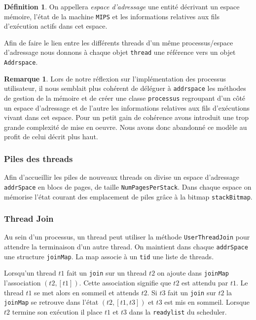 \documentclass[11pt]{article}
\theoremstyle{definition}
\newtheorem*{myRem}{Remarque}
\theoremstyle{definition}
\newtheorem*{myDef}{Définition}
\begin{document}
\begin{myDef}
  On appellera \textit{espace d'adressage} une entité décrivant un espace mémoire, l'état de la machine \texttt{MIPS} et les informations relatives aux fils d'exécution actifs dans cet espace.
\end{myDef}
Afin de faire le lien entre les différents threads d'un même processus/espace d'adressage nous donnons à chaque objet \texttt{thread} une référence vers un objet \texttt{Addrspace}.
\begin{myRem}
Lors de notre réflexion sur l'implémentation des processus utilisateur, il nous semblait plus cohérent de déléguer à \texttt{addrspace} les méthodes de gestion de la mémoire et de créer une classe \texttt{processus} regroupant d'un côté un espace d'adressage et de l'autre les informations relatives aux fils d'exécutions vivant dans cet espace. Pour un petit gain de cohérence avons introduit une trop grande complexité de mise en oeuvre. Nous avons donc abandonné ce modèle au profit de celui décrit plus haut.
\end{myRem}

\subsubsection{Piles des threads}
Afin d'accueillir les piles de nouveaux threads on divise un espace d'adressage \texttt{addrSpace} en blocs de pages, de taille \texttt{NumPagesPerStack}.
Dans chaque espace on mémorise l'état courant des emplacement de piles grâce à la bitmap \texttt{stackBitmap}. 

\subsubsection{Thread Join}
Au sein d'un processus, un thread peut utiliser la méthode \texttt{UserThreadJoin} pour attendre la terminaison d'un autre thread.
On maintient dans chaque \texttt{addrSpace} une structure \texttt{joinMap}.
La map associe à un \texttt{tid} une liste de threads.

Lorsqu'un thread $t1$ fait un \texttt{join} sur un thread $t2$ on ajoute dans \texttt{joinMap}
l'association $(t2, [t1])$. Cette association signifie que $t2$ est attendu par $t1$.
Le thread $t1$ se met alors en sommeil et attends $t2$. 
Si $t3$ fait un \texttt{join} sur $t2$ la \texttt{joinMap} se retrouve dans l'état $(t2, [t1,t3])$ et $t3$ est mis en sommeil.
Lorsque $t2$ termine son exécution il place $t1$ et $t3$ dans la \texttt{readylist} du scheduler.
\end{document}
